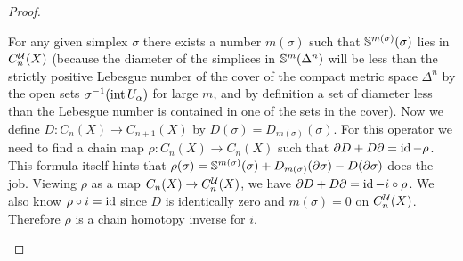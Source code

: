 \begin{proof}
\begin{enumerate}
         For any given simplex $\sigma$ there exists a number $m(\sigma)$ such that $\mathbb{S}^{m(\sigma)}(\sigma)$ lies in $C^{\mathcal{U}}_n(X)$ (because the diameter of the simplices in $\mathbb{S}^m(\Delta^n)$ will be less than the strictly positive Lebesgue number of the cover of the compact metric space $\Delta^n$ by the open sets $\sigma^{-1}(\operatorname{int} U_\alpha)$ for large $m$, and by definition a set of diameter less than the Lebesgue number is contained in one of the sets in the cover). Now we define $D:C_n(X)\to C_{n+1}(X)$ by  $D(\sigma)=D_{m(\sigma)}(\sigma)$. For this operator we need to find a chain map $\rho:C_n(X)\to C_n(X)$ such that $\partial D+D\partial=\operatorname{id}-\rho$. This formula itself hints that $\rho(\sigma)=\mathbb{S}^{m(\sigma)}(\sigma)+D_{m(\sigma)}(\partial\sigma)-D(\partial\sigma)$ does the job. Viewing $\rho$ as a map $C_n(X)\to C_n^{\mathcal{U}}(X)$, we have $\partial D+D\partial=\operatorname{id}-i\circ\rho$. We also know $\rho\circ i=\operatorname{id}$ since $D$ is identically zero and $m(\sigma)=0$ on $C_n^{\mathcal{U}}(X)$. Therefore $\rho$ is a chain homotopy inverse for $i$.
     \end{enumerate}
\end{proof}

